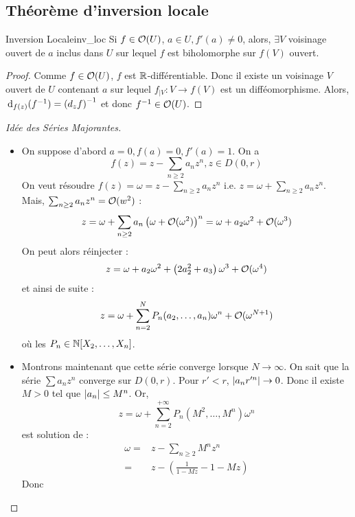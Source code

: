 \documentclass{cours}
\begin{document}
\subsection{Théorème d'inversion locale}
\begin{théorème}{Inversion Locale}{inv_loc}
    Si $f\in \mathcal{O}(U)$, $a \in U, f'(a) \neq 0$, alors, $\exists V$ voisinage ouvert de $a$ inclus dans $U$ sur lequel $f$ est biholomorphe sur $f(V)$ ouvert. 
\end{théorème}
\begin{proof}
    Comme $f\in \mathcal{O}(U)$, $f$ est $\mathbb{R}$-différentiable. Donc il existe un voisinage $V$ ouvert de $U$ contenant $a$ sur lequel $f_{\mid V} : V \to f(V)$ est un difféomorphisme. Alors, ${\rm \, d}_{f(z)}(f^{-1}) = \left(d_{z} f\right)^{-1}$ et donc $f^{-1} \in \mathcal{O}(U)$.
\end{proof}
\begin{proof}[Idée des Séries Majorantes]
    \begin{itemize}
        \item On suppose d'abord $a = 0, f(a) = 0, f'(a) = 1$. On a 
        \[
            f(z) = z - \sum_{n \geq 2}a_{n}z^{n}, z\in D(0, r)
        \]
        On veut résoudre $f(z) = \omega = z - \sum_{n \geq 2} a_{n}z^{n}$ i.e. $z = \omega + \sum_{n \geq 2}a_{n}z^{n}$. Mais, $\sum_{n \geq 2}a_{n}z^{n} = \mathcal{O}(w^{2})$ : 
        \[
            z = \omega + \sum_{n \geq 2}a_{n}\left(\omega + \mathcal{O}(\omega^{2})\right)^{n} = \omega + a_{2}\omega^{2} + \mathcal{O}(\omega^{3})
        \]
        On peut alors réinjecter : 
        \[
            z = \omega + a_{2}\omega^{2} + \left(2a_{2}^{2} + a_{3}\right)\omega^{3} + \mathcal{O}(\omega^{4})
        \]
        et ainsi de suite : 
        \[
            z = \omega + \sum_{n = 2}^{N}P_{n}(a_{2}, \ldots, a_{n})\omega^{n} + \mathcal{O}(\omega^{N+1})
        \]
        où les $P_{n} \in \mathbb{N}[X_{2}, \ldots, X_{n}]$.
        \item Montrons maintenant que cette série converge lorsque $N \to \infty$. On sait que la série $\sum a_{n}z^{n}$ converge sur $D(0, r)$. Pour $r' < r$, $\left|a_{n}r'^{n}\right| \to 0$. Donc il existe $M > 0$ tel que $\left|a_{n}\right|\leq M^{n}$. Or, \[z = \omega + \sum_{n = 2}^{+ \infty}P_{n}\left(M^{2}, \ldots, M^{n}\right)\omega^{n}\] est solution de :
        \[
            \begin{aligned}
                \omega =& z - \sum_{n \geq 2}M^{n}z^{n}\\
                =& z - \left(\frac{1}{1 - Mz} - 1 - Mz\right)
            \end{aligned}
        \]
        Donc 

\end{itemize}
\end{proof}
\end{document}

